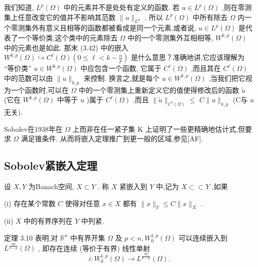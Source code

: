 \documentclass[lang=cn,newtx,10pt,scheme=chinese,thmcnt=chapter]{elegantbook}
\begin{document}
\begin{note}
    我们知道, \({L}^{p}\left( \Omega \right)\) 中的元素并不是处处有定义的函数. 若 \(u \in  {L}^{p}\left( \Omega \right)\) ,则在零测集上任意改变它的值并不影响其范数 \(\parallel u{\parallel }_{{L}^{p}}\) . 所以 \({L}^{p}\left( \Omega \right)\) 中所有除去 \(\Omega\) 内一个零测集外有意义且相等的函数都被看成是同一个元素,或者说, \(u \in  {L}^{p}\left( \Omega \right)\) 是代表了一个等价类,这个类中的元素除去 \(\Omega\) 中的一个零测集外互相相等, \({W}^{k,p}\left( \Omega \right)\) 中的元素也是如此. 那末 (3.42) 中的嵌入 \({W}^{k,p}\left( \Omega \right)  \hookrightarrow  {C}^{\ell }\left( \Omega \right) \left( {0 \leqslant  \ell  < k - \frac{n}{p}}\right)\) 是什么意思？准确地讲,它应该理解为 “等价类” \(u \in  {W}^{k,p}\left( \Omega \right)\) 中应包含一个函数, 它属于 \({C}^{\ell }\left( \Omega \right)\) ,而且其在 \({C}^{\ell }\left( \Omega \right)\) 中的范数可以由 \(\parallel u{\parallel }_{k,p}\) 来控制. 换言之,就是每个 \(u \in  {W}^{k,p}\left( \Omega \right)\) ,当我们把它视为一个函数时,可以在 \(\Omega\) 中的一个零测集上重新定义它的值使得修改后的函数 \(\widetilde{u}\) (它在 \({W}^{k,p}\left( \Omega \right)\) 中等于 \(u\) )属于 \({C}^{\ell }\left( \Omega \right)\) ,而且 \(\parallel \widetilde{u}{\parallel }_{{C}^{\ell }\left( \Omega \right) } \leqslant\)  \(C\parallel u{\parallel }_{k,p}\) (C与 \(u\) 无关).

 Sobolev在1938年在 \(\Omega\) 上而非在任一紧子集 \(\mathrm{K}\) 上证明了一些更精确地估计式,但要求 \(\Omega\) 满足锥条件. 从而将嵌入定理推广到更一般的区域,参见[AF].

\end{note}

\subsection{Sobolev紧嵌入定理}
\begin{definition}
    设 \(X,Y\) 为Banach空间, \(X \subset  Y\) . 称 \(X\) 紧嵌入到 \(Y\) 中,记为 \(X \subset   \subset  Y\) ,如果

(i) 存在某个常数 \(C\) 使得对任意 \(x \in  X\) 都有 \(\parallel x{\parallel }_{Y} \leqslant  C\parallel x{\parallel }_{X}\) .

(ii) \(X\) 中的有界序列在 \(Y\) 中列紧.
\end{definition}

定理 3.10 表明,对 \({\mathbb{R}}^{n}\) 中有界开集 \(\Omega\) 及 \(p < n,{W}_{0}^{1,p}\left( \Omega \right)\) 可以连续嵌入到 \({L}^{\frac{np}{n - p}}\left( \Omega \right)\) , 即存在连续 (等价于有界) 线性单射
\begin{equation}
i : {W}_{0}^{1,p}\left( \Omega \right)  \rightarrow  {L}^{\frac{np}{n - p}}\left( \Omega \right) . \label{3.43}
\end{equation}
\end{document}
